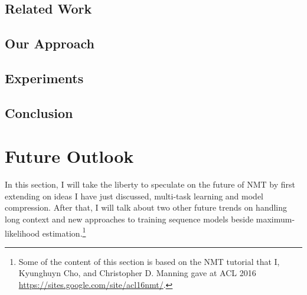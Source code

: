 \subsection{Related Work}
\label{subsec:related}



\subsection{Our Approach}
\label{subsec:approach}


\subsection{Experiments}
\label{subsec:exp}


\subsection{Conclusion}
\label{subsec:conclusion}


\section{Future Outlook}
\label{sec:outlook}
In this section, I will take the liberty to speculate on the future of NMT by first extending on ideas I have just discussed, multi-task learning and model compression. After that, I will talk about two other future trends on handling long context and new approaches to training sequence models beside maximum-likelihood estimation.\footnote{Some of the content of this section is based on the NMT tutorial that I, Kyunghuyn Cho, and Christopher D. Manning gave at ACL 2016 \url{https://sites.google.com/site/acl16nmt/}.}

